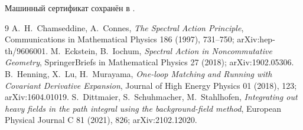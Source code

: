 Машинный сертификат сохранён в
.

\begin{thebibliography}{9}
A.~H.~Chamseddine, A.~Connes,
\emph{The Spectral Action Principle}, Communications in Mathematical
Physics 186 (1997), 731--750; arXiv:hep-th/9606001.
M.~Eckstein, B.~Iochum,
\emph{Spectral Action in Noncommutative Geometry}, SpringerBriefs in
Mathematical Physics 27 (2018); arXiv:1902.05306.
B.~Henning, X.~Lu, H.~Murayama,
\emph{One-loop Matching and Running with Covariant Derivative Expansion},
Journal of High Energy Physics 01 (2018), 123; arXiv:1604.01019.
S.~Dittmaier, S.~Schuhmacher, M.~Stahlhofen,
\emph{Integrating out heavy fields in the path integral using the
background-field method}, European Physical Journal C 81 (2021), 826;
arXiv:2102.12020.
\end{thebibliography}